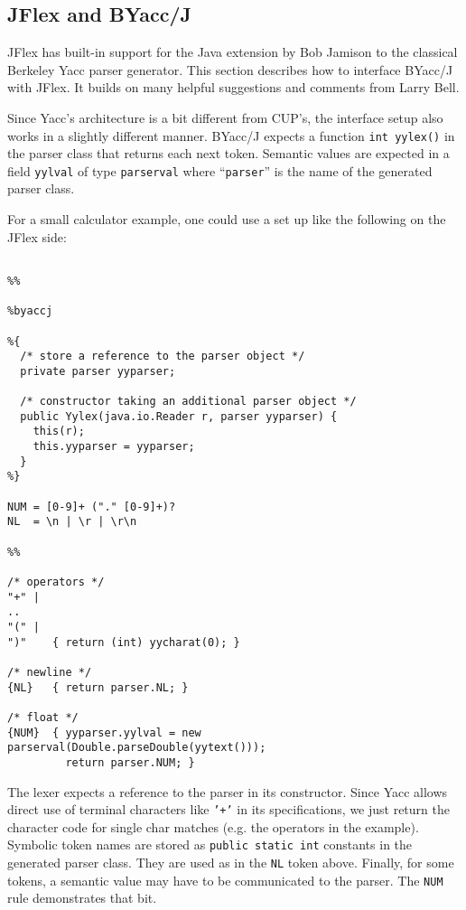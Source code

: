 \documentclass[11pt]{scrartcl}
\newcommand{\xsmall}{}
\begin{document}
\subsection{JFlex and BYacc/J\label{YaccWork}}

JFlex has built-in support for the Java extension 
\cite{BYaccJ} by Bob Jamison
to the classical Berkeley Yacc parser generator.
This section describes how to interface BYacc/J with JFlex. It
builds on many helpful suggestions and comments from Larry Bell.

Since Yacc's architecture is a bit different from CUP's, the
interface setup also works in a slightly different manner.
BYacc/J expects a function \texttt{int yylex()} in the parser
class that returns each next token. Semantic values are expected
in a field \texttt{yylval} of type \texttt{parserval} where ``\texttt{parser}''
is the name of the generated parser class.

For a small calculator example, one could use a set up like the 
following on the JFlex side:

{\xsmall\begin{verbatim}

%%

%byaccj

%{
  /* store a reference to the parser object */
  private parser yyparser;

  /* constructor taking an additional parser object */
  public Yylex(java.io.Reader r, parser yyparser) {
    this(r);
    this.yyparser = yyparser;
  }
%}

NUM = [0-9]+ ("." [0-9]+)?
NL  = \n | \r | \r\n

%%

/* operators */
"+" | 
..
"(" | 
")"    { return (int) yycharat(0); }

/* newline */
{NL}   { return parser.NL; }

/* float */
{NUM}  { yyparser.yylval = new parserval(Double.parseDouble(yytext()));
         return parser.NUM; }
\end{verbatim}
}

The lexer expects a reference to the parser in its constructor.
Since Yacc allows direct use of terminal characters like \texttt{'+'}
in its specifications, we just return the character code for
single char matches (e.g. the operators in the example). Symbolic
token names are stored as \texttt{public static int} constants in
the generated parser class. They are used as in the \texttt{NL} token
above. Finally, for some tokens, a semantic value may have to be 
communicated to the parser. The \texttt{NUM} rule demonstrates that
bit.
\end{document}
